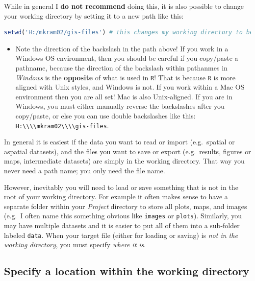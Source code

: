 \documentclass[
]{book}
\newcommand{\passthrough}[1]{#1}
\newenvironment{rmdblock}[1]
  {%
  \begin{itemize}
  \renewcommand{\labelitemi}{
    \raisebox{-.7\height}[0pt][0pt]{
      {\setkeys{Gin}{width=3em,keepaspectratio}\texttt{[image: images/\#1]}}
    }
  }
  \item
  }
  {
  \end{itemize}
  }
\newenvironment{rmdcaution}
  {\begin{rmdblock}{caution}}
  {\end{rmdblock}}
\begin{document}
While in general I \textbf{do not recommend} doing this, it is also possible to change your working directory by setting it to a new path like this:

\begin{lstlisting}[language=R]
setwd('H:/mkram02/gis-files') # this changes my working directory to be on the H:/ drive
\end{lstlisting}

\begin{rmdcaution}
Note the direction of the backslash in the path above! If you work in a Windows OS environment, then you should be careful if you copy/paste a pathname, because the direction of the backslash within pathanmes in \emph{Windows} is the \textbf{opposite} of what is used in \passthrough{\lstinline!R!}! That is because \passthrough{\lstinline!R!} is more aligned with Unix styles, and Windows is not. If you work within a Mac OS environment then you are all set! Mac is also Unix-aligned. If you are in Windows, you must either manually reverse the backslashes after you copy/paste, or else you can use double backslashes like this: \passthrough{\lstinline!H:\\\\mkram02\\\\gis-files!}.
\end{rmdcaution}

In general it is easiest if the data you want to read or import (e.g.~spatial or aspatial datasets), and the files you want to save or export (e.g.~results, figures or maps, intermediate datasets) are simply in the working directory. That way you never need a path name; you only need the file name.

However, inevitably you will need to load or save something that is not in the root of your working directory. For example it often makes sense to have a separate folder within your \emph{Project} directory to store all plots, maps, and images (e.g.~I often name this something obvious like \passthrough{\lstinline!images!} or \passthrough{\lstinline!plots!}). Similarly, you may have multiple datasets and it is easier to put all of them into a sub-folder labeled \passthrough{\lstinline!data!}. When your target file (either for loading or saving) is \emph{not in the working directory}, you must specify \emph{where it is}.

\hypertarget{specify-a-location-within-the-working-directory}{%
\subsection*{Specify a location within the working directory}\label{specify-a-location-within-the-working-directory}}
\end{document}
